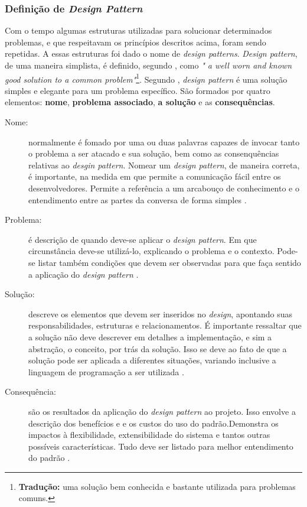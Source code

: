 \subsubsection{Definição de \textit{Design Pattern}} 
Com o tempo algumas estruturas utilizadas para solucionar determinados problemas, e que respeitavam os princípios descritos acima, foram sendo repetidas. A essas estruturas foi dado o nome de \textit{design patterns}. \textit{Design pattern}, de uma maneira simplista, é definido, segundo , como \textit{" a well worn and known good solution to
a common problem"}\footnote{\textbf{Tradução:} uma solução bem conhecida e bastante utilizada para problemas comuns.}. Segundo , \textit{design pattern} é uma solução simples e elegante para um problema específico. São formados por quatro elementos: \textbf{nome}, \textbf{problema associado}, \textbf{a solução} e as \textbf{consequências}.
\begin{description}
\item[Nome:] normalmente é fomado por uma ou duas palavras capazes de invocar tanto o problema a ser atacado e sua solução, bem como as consenquências relativas ao \textit{desgin pattern}. Nomear um \textit{design pattern}, de maneira correta, é importante, na medida em que permite a comunicação fácil entre os desenvolvedores. Permite a referência a um arcabouço de conhecimento e o entendimento entre as partes da conversa de forma simples \cite{martin2000}.
\item[Problema:] é descrição de quando deve-se aplicar o \textit{design pattern}. Em que circunstância deve-se utilizá-lo, explicando o problema e o contexto. Pode-se listar também condições que devem ser observadas para que faça sentido a aplicação do \textit{design pattern} \cite{martin2000}.
\item[Solução:] descreve os elementos que devem ser inseridos no \textit{design}, apontando suas responsabilidades, estruturas e relacionamentos. É importante ressaltar que a solução não deve descrever em detalhes a implementação, e sim a abstração, o conceito, por trás da solução. Isso se deve ao fato de que a solução pode ser aplicada a diferentes situações, variando inclusive a linguagem de programação a ser utilizada \cite{martin2000}.
\item[Consequência:] são os resultados da aplicação do \textit{design pattern} ao projeto. Isso envolve a descrição dos benefícios e e os custos do uso do padrão.Demonstra os impactos à flexibilidade, extensibilidade do sistema e tantos outras possíveis características. Tudo deve ser listado para melhor entendimento do padrão \cite{martin2000}.
\end{description}
\par

